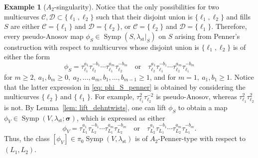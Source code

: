 \documentclass[12pt]{article}
\renewcommand{\ge}{\geqslant}
\renewcommand{\geq}{\geqslant}
\theoremstyle{theorem}
\theoremstyle{definition}
\newtheorem{example}[theorem]{Example}
\theoremstyle{remark}
\numberwithin{equation}{section}
\DeclareMathOperator{\Symp}{Symp}
\DeclareMathOperator{\st}{st}
\begin{document}
\begin{example}[$A_2$-singularity]
Notice that the only possibilities for two multicurves $\mathcal{C},\mathcal{D}\subset \{\ell_1,\ell_2\}$ such that their disjoint union is $\{\ell_1,\ell_2\}$ and fills $S$ are either $\mathcal{C}=\{\ell_1\}$ and $\mathcal{D}=\{\ell_2\}$, or $\mathcal{C}=\{\ell_2\}$ and $\mathcal{D}=\{\ell_1\}$.
Therefore, every pseudo-Anosov map $\phi_S\in\Symp(S,\lambda_{\st}|_S)$ on $S$ arising from Penner's construction with respect to multicurves whose disjoint union is $\{\ell_1,\ell_2\}$ is of either the form
\begin{equation}\label{eq: phi_S_penner}
	\phi_S=\tau_{\ell_1}^{a_1}\tau_{\ell_2}^{-b_1}\cdots\tau_{\ell_1}^{a_m}\tau_{\ell_2}^{-b_m}
\quad\text{or}\quad \tau_{\ell_2}^{a_1}\tau_{\ell_1}^{-b_1}\cdots\tau_{\ell_2}^{a_m}\tau_{\ell_1}^{-b_m}
\end{equation}
for $m\ge2,\ a_1,b_m\ge0,\ a_2,\dots,a_m,b_1,\dots,b_{m-1}\ge1$, and for $m=1,\ a_1,b_1\geq 1$.
Notice that the latter expression in \eqref{eq: phi_S_penner} is obtained by considering the multicurves $\{\ell_2\}$ and $\{\ell_1\}$.
For example, $\tau_{\ell_1}^2\tau_{\ell_2}^{-2}$ is pseudo-Anosov, whereas $\tau_{\ell_1}^2\tau_{\ell_2}^{2}$ is not.
By Lemma~\ref{lem: lift_dehntwists}, one can lift $\phi_S$ to obtain a map $\phi_V\in\Symp(V,\lambda_{\st};{\bm \sigma})$, which is expressed as either
\begin{equation}\label{eq: A2_pennerLag}
\phi_V=\tau_{L_1}^{a_1}\tau_{L_2}^{-b_1}\cdots\tau_{L_1}^{a_m}\tau_{L_2}^{-b_m}\quad\text{or}\quad
\tau_{L_2}^{a_1}\tau_{L_1}^{-b_1}\cdots\tau_{L_2}^{a_m}\tau_{L_1}^{-b_m}.
\end{equation}
Thus, the class $[\phi_V]\in\pi_0\Symp(V,\lambda_{\st})$ is of $A_2$-Penner-type with respect to $(L_1,L_2)$.
\end{example}
\end{document}
